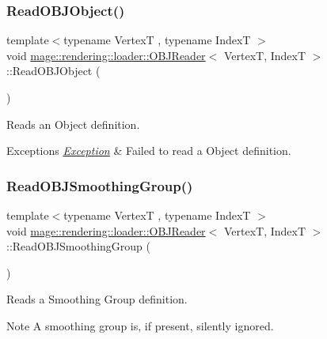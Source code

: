 \subsubsection{\texorpdfstring{Read\+O\+B\+J\+Object()}{ReadOBJObject()}}
{\footnotesize\ttfamily template$<$typename VertexT , typename IndexT $>$ \\
void \hyperlink{classmage_1_1rendering_1_1loader_1_1_o_b_j_reader}{mage\+::rendering\+::loader\+::\+O\+B\+J\+Reader}$<$ VertexT, IndexT $>$\+::Read\+O\+B\+J\+Object (\begin{DoxyParamCaption}{ }\end{DoxyParamCaption})\hspace{0.3cm}{\ttfamily [private]}}

Reads an Object definition.


\begin{DoxyExceptions}{Exceptions}
{\em \hyperlink{classmage_1_1_exception}{Exception}} & Failed to read a Object definition. \\
\hline
\end{DoxyExceptions}
\hypertarget{classmage_1_1rendering_1_1loader_1_1_o_b_j_reader_ac7f3807cf0a0ae24b340cb8208c5b2ef}{}\label{classmage_1_1rendering_1_1loader_1_1_o_b_j_reader_ac7f3807cf0a0ae24b340cb8208c5b2ef} 
\subsubsection{\texorpdfstring{Read\+O\+B\+J\+Smoothing\+Group()}{ReadOBJSmoothingGroup()}}
{\footnotesize\ttfamily template$<$typename VertexT , typename IndexT $>$ \\
void \hyperlink{classmage_1_1rendering_1_1loader_1_1_o_b_j_reader}{mage\+::rendering\+::loader\+::\+O\+B\+J\+Reader}$<$ VertexT, IndexT $>$\+::Read\+O\+B\+J\+Smoothing\+Group (\begin{DoxyParamCaption}{ }\end{DoxyParamCaption})\hspace{0.3cm}{\ttfamily [private]}}

Reads a Smoothing Group definition.

\begin{DoxyNote}{Note}
A smoothing group is, if present, silently ignored. 
\end{DoxyNote}

